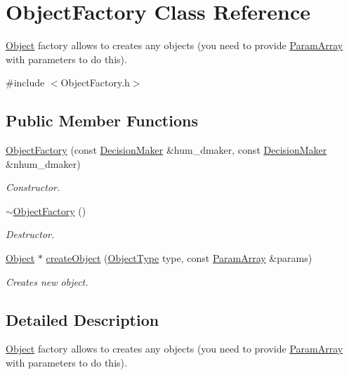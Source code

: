 \hypertarget{classObjectFactory}{\section{Object\-Factory Class Reference}
\label{classObjectFactory}
}


\hyperlink{classObject}{Object} factory allows to creates any objects (you need to provide \hyperlink{classParamArray}{Param\-Array} with parameters to do this).  




{\ttfamily \#include $<$Object\-Factory.\-h$>$}

\subsection*{Public Member Functions}
\begin{DoxyCompactItemize}
\item 
\hyperlink{classObjectFactory_a3a732c533e17d2f62b753138d9da0eb4}{Object\-Factory} (const \hyperlink{classDecisionMaker}{Decision\-Maker} \&hum\-\_\-dmaker, const \hyperlink{classDecisionMaker}{Decision\-Maker} \&nhum\-\_\-dmaker)
\begin{DoxyCompactList}\small\item\em Constructor. \end{DoxyCompactList}\item 
\hyperlink{classObjectFactory_a04a1138c18e740b8f0fd580b3d52af1c}{$\sim$\-Object\-Factory} ()
\begin{DoxyCompactList}\small\item\em Destructor. \end{DoxyCompactList}\item 
\hyperlink{classObject}{Object} $\ast$ \hyperlink{classObjectFactory_a6c7102f01ee8e5bf6a3ca562e2b2aba0}{create\-Object} (\hyperlink{BasicTypes_8h_a842c5e2e69277690b064bf363c017980}{Object\-Type} type, const \hyperlink{classParamArray}{Param\-Array} \&params)
\begin{DoxyCompactList}\small\item\em Creates new object. \end{DoxyCompactList}\end{DoxyCompactItemize}


\subsection{Detailed Description}
\hyperlink{classObject}{Object} factory allows to creates any objects (you need to provide \hyperlink{classParamArray}{Param\-Array} with parameters to do this). 

